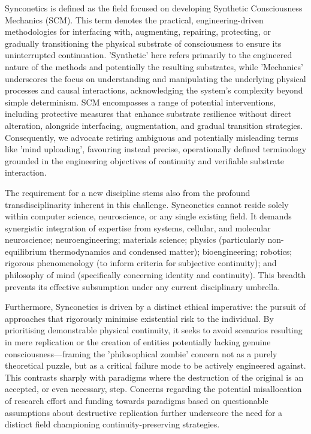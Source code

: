 \documentclass[10pt]{article}
\begin{document}
\begin{sloppypar}
  Synconetics is defined as the field focused on developing Synthetic Consciousness Mechanics (SCM). This term denotes the practical, engineering-driven methodologies for interfacing with, augmenting, repairing, protecting, or gradually transitioning the physical substrate of consciousness to ensure its uninterrupted continuation. 'Synthetic' here refers primarily to the engineered nature of the methods and potentially the resulting substrates, while 'Mechanics' underscores the focus on understanding and manipulating the underlying physical processes and causal interactions, acknowledging the system's complexity beyond simple determinism. SCM encompasses a range of potential interventions, including protective measures that enhance substrate resilience without direct alteration, alongside interfacing, augmentation, and gradual transition strategies. Consequently, we advocate retiring ambiguous and potentially misleading terms like 'mind uploading', favouring instead precise, operationally defined terminology grounded in the engineering objectives of continuity and verifiable substrate interaction.

  The requirement for a new discipline stems also from the profound transdisciplinarity inherent in this challenge. Synconetics cannot reside solely within computer science, neuroscience, or any single existing field. It demands synergistic integration of expertise from systems, cellular, and molecular neuroscience; neuroengineering; materials science; physics (particularly non-equilibrium thermodynamics and condensed matter); bioengineering; robotics; rigorous phenomenology (to inform criteria for subjective continuity); and philosophy of mind (specifically concerning identity and continuity). This breadth prevents its effective subsumption under any current disciplinary umbrella.

  Furthermore, Synconetics is driven by a distinct ethical imperative: the pursuit of approaches that rigorously minimise existential risk to the individual. By prioritising demonstrable physical continuity, it seeks to avoid scenarios resulting in mere replication or the creation of entities potentially lacking genuine consciousness—framing the 'philosophical zombie' concern not as a purely theoretical puzzle, but as a critical failure mode to be actively engineered against. This contrasts sharply with paradigms where the destruction of the original is an accepted, or even necessary, step. Concerns regarding the potential misallocation of research effort and funding towards paradigms based on questionable assumptions about destructive replication further underscore the need for a distinct field championing continuity-preserving strategies.


\end{sloppypar}
\end{document}
